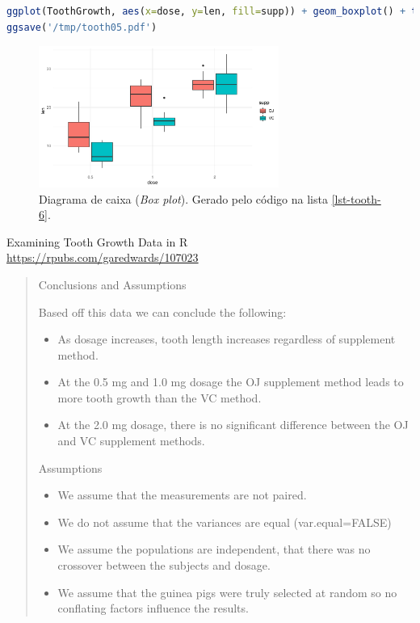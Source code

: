 \begin{frame}
\framebreak

\begin{lstlisting}[language=R, label=lst-tooth-6, caption={Box plot.}, postbreak=\mbox{$\hookrightarrow$\space}, basicstyle=\fontsize{8}{10}\selectfont\ttfamily]
ggplot(ToothGrowth, aes(x=dose, y=len, fill=supp)) + geom_boxplot() + theme_minimal()
ggsave('/tmp/tooth05.pdf')
\end{lstlisting}

\begin{figure}[h]
 \centering
  \includegraphics[width=0.7\textwidth,height=0.7\textheight,keepaspectratio]{figures/tooth05.pdf}
 \caption{Diagrama de caixa (\emph{Box plot}). Gerado pelo código na lista \ref{lst-tooth-6}.}
 \label{fig-tooth05}
\end{figure}

\framebreak

\begin{footnotesize}
Examining Tooth Growth Data in R\\
\url{https://rpubs.com/garedwards/107023}

\begin{quote}
Conclusions and Assumptions

Based off this data we can conclude the following:
\begin{itemize}
\item As dosage increases, tooth length increases regardless of supplement method.
\item At the 0.5 mg and 1.0 mg dosage the OJ supplement method leads to more tooth growth than the VC method.
\item At the 2.0 mg dosage, there is no significant difference between the OJ and VC supplement methods.
\end{itemize}

Assumptions
\begin{itemize}
\item We assume that the measurements are not paired.
\item We do not assume that the variances are equal (var.equal=FALSE)
\item We assume the populations are independent, that there was no crossover between the subjects and dosage.
\item We assume that the guinea pigs were truly selected at random so no conflating factors influence the results.
\end{itemize}
\end{quote}
\end{footnotesize}
\end{frame}


